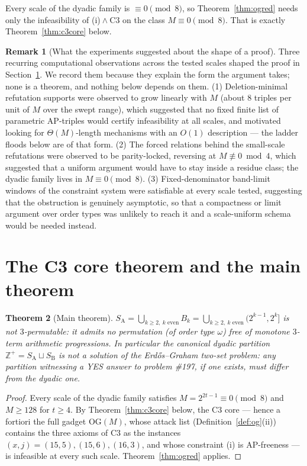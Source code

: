 \documentclass[11pt]{article}
\newtheorem{theorem}{Theorem}
\theoremstyle{definition}
\newtheorem{remark}[theorem]{Remark}
\newcommand{\Z}{\mathbb{Z}}
\newcommand{\SA}{S_{\mathrm{A}}}
\newcommand{\SB}{S_{\mathrm{B}}}
\newcommand{\OG}{\mathrm{OG}}
\begin{document}
Every scale of the dyadic family is $\equiv 0 \pmod 8$, so
Theorem~\ref{thm:ogred} needs only the infeasibility of
(i)${}\wedge{}\mathrm{C3}$ on the class $M \equiv 0 \pmod 8$. That is
exactly Theorem~\ref{thm:c3core} below.

\begin{remark}[What the experiments suggested about the shape of a proof]
Three recurring computational observations across the tested scales shaped
the proof in Section~\ref{sec:c3}. We record them because they explain the
form the argument takes; none is a theorem, and nothing below depends on
them.
(1) Deletion-minimal refutation supports were observed to grow linearly
with $M$ (about $8$ triples per unit of $M$ over the swept range), which
suggested that no fixed finite list of
parametric AP-triples would certify infeasibility at all scales, and
motivated looking for $\Theta(M)$-length mechanisms with an $O(1)$
description --- the ladder floods below are of that form. (2) The forced
relations behind the small-scale refutations were observed to be
parity-locked, reversing at
$M \not\equiv 0 \bmod 4$, which suggested that a uniform argument would have
to stay inside a residue class; the dyadic family lives in
$M \equiv 0 \pmod 8$.
(3) Fixed-denominator band-limit windows of the constraint system were
satisfiable at every scale tested, suggesting that the obstruction is
genuinely asymptotic, so that a compactness or limit argument over order
types was unlikely to reach it and a scale-uniform schema would be needed
instead.
\end{remark}

\section{The C3 core theorem and the main theorem}\label{sec:c3}

\begin{theorem}[Main theorem]\label{thm:main}
$\SA = \bigcup_{k \ge 2,\ k \text{ even}} B_k
= \bigcup_{k \ge 2,\ k \text{ even}} (2^{k-1}, 2^k]$ is not $3$-permutable:
it admits no permutation (of order type $\omega$) free of monotone
$3$-term arithmetic progressions. In particular the canonical dyadic
partition $\Z^+ = \SA \sqcup \SB{}$ is not a solution of the
Erd\H{o}s--Graham two-set problem: any partition witnessing a YES answer
to problem \#197, if one exists, must differ from the dyadic one.
\end{theorem}

\begin{proof}
Every scale of the dyadic family satisfies $M = 2^{2t-1} \equiv 0
\pmod 8$ and $M \ge 128$ for $t \ge 4$. By Theorem~\ref{thm:c3core}
below, the C3 core --- hence a fortiori the full gadget $\OG(M)$, whose
attack list (Definition~\ref{def:og}(ii)) contains the three axioms of
$\mathrm{C3}$ as the instances $(x, j) = (15, 5), (15, 6), (16, 3)$,
and whose constraint (i) is AP-freeness
--- is infeasible at every such scale. Theorem~\ref{thm:ogred} applies.
\end{proof}
\end{document}

